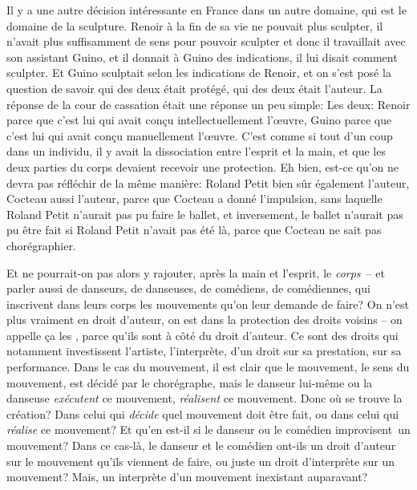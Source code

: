 {Il y a une autre d\'ecision int\'eressante en France dans un autre
domaine, qui est le domaine de la sculpture. Renoir \`a la fin de sa
vie ne pouvait plus sculpter, il n'avait plus suffisamment de sens pour
pouvoir sculpter et donc il travaillait avec son assistant Guino, et il
donnait \`a Guino des indications, il lui disait comment sculpter. Et
Guino sculptait selon les indications de Renoir, et on s'est pos\'e la
question de savoir qui des deux \'etait prot\'eg\'e, qui des deux
\'etait l'auteur. La r\'eponse de la cour de cassation \'etait une
r\'eponse un peu simple:  Les deux: Renoir parce que c'est
lui qui avait con\c{c}u intellectuellement l'{\oe}uvre, Guino parce que
c'est lui qui avait con\c{c}u manuellement l'{\oe}uvre. C'est comme si
tout d'un coup dans un individu, il y avait la dissociation entre
l'esprit et la main, et que les deux parties du corps devaient recevoir
une protection. Eh bien, est{}-ce qu'on ne devra pas r\'efl\'echir de
la m\^eme mani\`ere: Roland Petit bien s\^ur \'egalement l'auteur,
Cocteau aussi l'auteur, parce que Cocteau a donn\'e l'impulsion, sans
laquelle Roland Petit n'aurait pas pu faire le ballet, et inversement,
le ballet n'aurait pas pu \^etre fait si Roland Petit n'avait pas
\'et\'e l\`a, parce que Cocteau ne sait pas chor\'egraphier.\par

Et ne pourrait{}-on pas alors y rajouter, apr\`es la main et
l'esprit, le {\em corps}~{--} et parler aussi de danseurs, de
danseuses, de com\'ediens, de com\'ediennes, qui inscrivent dans leurs
corps les mouvements qu'on leur demande de faire? On n'est plus
vraiment en droit d'auteur, on est dans la protection des droits
voisins {--} on appelle \c{c}a les , parce qu'ils sont
\`a c\^ot\'e du droit d'auteur. Ce sont des droits qui notamment
investissent l'artiste, l'interpr\`ete, d'un droit sur sa prestation,
sur sa performance. Dans le cas du mouvement, il est clair que le
mouvement, le sens du mouvement, est d\'ecid\'e par le chor\'egraphe,
mais le danseur lui{}-m\^eme ou la danseuse {\em ex\'ecutent} ce
mouvement, {\em r\'ealisent} ce mouvement. Donc o\`u se trouve la
cr\'eation? Dans celui qui {\em d\'ecide} quel mouvement doit \^etre
fait, ou dans celui qui {\em r\'ealise} ce mouvement? Et qu'en
est{}-il si le danseur ou le com\'edien improvisent~un mouvement? Dans
ce cas{}-l\`a, le danseur et le com\'edien ont{}-ils un droit d'auteur
sur le mouvement qu'ils viennent de faire, ou juste un droit
d'interpr\`ete sur un mouvement? Mais, un interpr\`ete d'un mouvement
inexistant auparavant?\par

}
